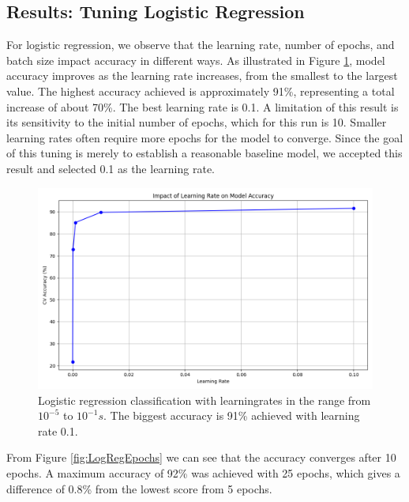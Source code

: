\subsection{Results: Tuning Logistic Regression }
For logistic regression, we observe that the learning rate, number of epochs, and batch size impact accuracy in different ways. As illustrated in Figure \ref{fig:LogRegLearningRate}, model accuracy improves as the learning rate increases, from the smallest to the largest value. The highest accuracy achieved is approximately 91\%, representing a total increase of about 70\%. The best learning rate is 0.1. A limitation of this result is its sensitivity to the initial number of epochs, which for this run is 10. Smaller learning rates often require more epochs for the model to converge. Since the goal of this tuning is merely to establish a reasonable baseline model, we accepted this result and selected 0.1 as the learning rate.

\begin{figure}[H]
    \centering
    \includegraphics[width=\textwidth]{results/logreg/learning_rate_study.png}
    \caption{Logistic regression classification with learningrates in the range from $10^{-5}$ to $10^{-1}s$. The biggest accuracy is 91\% achieved with learning rate 0.1. }
    \label{fig:LogRegLearningRate}
\end{figure}

\newpage
From Figure \ref{fig:LogRegEpochs} we can see that the accuracy converges after 10 epochs. A maximum accuracy of 92\% was achieved with 25 epochs, which gives a difference of 0.8\% from the lowest score from 5 epochs. 

